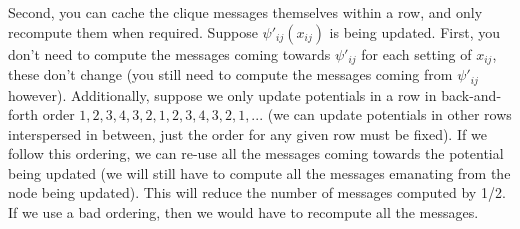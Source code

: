 \documentclass[11pt]{article}
\begin{document}
Second, you can cache the clique messages themselves within a row, and only recompute them when required. Suppose $\psi'_{ij}(x_{ij})$ is being updated. First, you don't need to compute the messages coming towards $\psi'_{ij}$ for each setting of $x_{ij}$, these don't change (you still need to compute the messages coming from $\psi'_{ij}$ however). Additionally, suppose we only update potentials in a row in back-and-forth order $1,2,3,4,3,2,1,2,3,4,3,2,1,...$ (we can update potentials in other rows interspersed in between, just the order for any given row must be fixed). If we follow this ordering, we can re-use all the messages coming towards the potential being updated (we will still have to compute all the messages emanating from the node being updated). This will reduce the number of messages computed by 1/2. If we use a bad ordering, then we would have to recompute all the messages.





\end{document}
